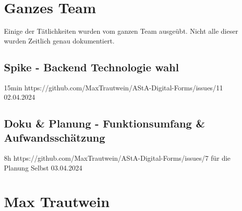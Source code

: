 \section{Ganzes Team}
Einige der Tätlichkeiten wurden vom ganzen Team ausgeübt.
Nicht alle dieser wurden Zeitlich genau dokumentiert.

\subsection{Spike - Backend Technologie wahl }
15min
https://github.com/MaxTrautwein/AStA-Digital-Forms/issues/11
02.04.2024

\subsection{Doku & Planung - Funktionsumfang & Aufwandsschätzung}
8h
https://github.com/MaxTrautwein/AStA-Digital-Forms/issues/7
für die Planung Selbst
03.04.2024

\section{Max Trautwein}\label{sec:max-trautwein}

